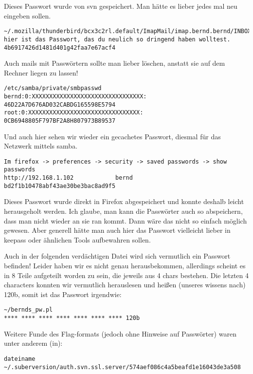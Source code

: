 \documentclass[10pt,a4paper]{article}
\begin{document}
Dieses Passwort wurde von svn gespeichert. Man hätte es lieber jedes mal neu eingeben sollen.

\begin{verbatim}
~/.mozilla/thunderbird/bcx3c2rl.default/ImapMail/imap.bernd.bernd/INBOX
hier ist das Passwort, das du neulich so dringend haben wolltest.
4b6917426d1481d401g42faa7e67acf4
\end{verbatim}

Auch mails mit Passwörtern sollte man lieber löschen, anstatt sie auf dem Rechner liegen zu lassen!

\begin{verbatim}
/etc/samba/private/smbpasswd
bernd:0:XXXXXXXXXXXXXXXXXXXXXXXXXXXXXXXX:
46D22A7D676AD032CABDG165598E5794
root:0:XXXXXXXXXXXXXXXXXXXXXXXXXXXXXXXX:
0CB6948805F797BF2A8H807973B89537
\end{verbatim}

Und auch hier sehen wir wieder ein gecachetes Passwort, diesmal für das Netzwerk mittels samba.

\begin{verbatim}
Im firefox -> preferences -> security -> saved passwords -> show passwords
http://192.168.1.102			bernd
bd2f1b10478abf43ae30be3bac8ad9f5
\end{verbatim}

Dieses Passwort wurde direkt in Firefox abgespeichert und konnte deshalb leicht herausgeholt werden. Ich glaube, man kann die Passwörter auch so abspeichern, dass man nicht wieder an sie ran kommt. Dann wäre das nicht so einfach möglich gewesen. Aber generell hätte man auch hier das Passwort vielleicht lieber in keepass oder ähnlichen Tools aufbewahren sollen.

Auch in der folgenden verdächtigen Datei wird sich vermutlich ein Passwort befinden! Leider haben wir es nicht genau herausbekommen, allerdings scheint es in 8 Teile aufgeteilt worden zu sein, die jeweils aus 4 chars bestehen. Die letzten 4 characters konnten wir vermutlich herauslesen und heißen (unseres wissens nach) 120b, somit ist das Passwort irgendwie:

\begin{verbatim}
~/bernds_pw.pl
**** **** **** **** **** **** **** 120b
\end{verbatim}

Weitere Funde des Flag-formats (jedoch ohne Hinweise auf Passwörter) waren unter anderem (in):
\begin{verbatim}
dateiname
~/.suberversion/auth.svn.ssl.server/574aef086c4a5beafd1e16043de3a508
\end{verbatim}
\end{document}
